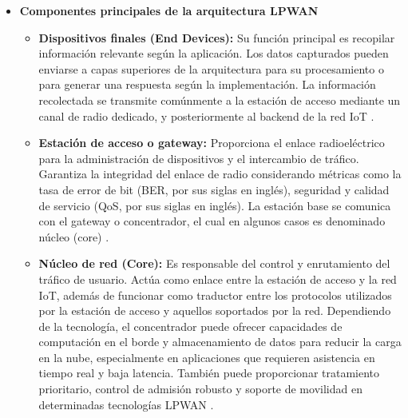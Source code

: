 \begin{itemize}

      \item \textbf{Componentes principales de la arquitectura LPWAN}

            \begin{itemize}

                  \item \textbf{Dispositivos finales (End Devices):} Su función
                        principal es recopilar información  relevante  según  la
                        aplicación. Los datos capturados pueden enviarse a capas
                        superiores de la arquitectura para  su  procesamiento  o
                        para generar una respuesta según la  implementación.  La
                        información recolectada se  transmite  comúnmente  a  la
                        estación de acceso mediante un canal de radio  dedicado,
                        y   posteriormente   al   backend   de   la   red    IoT
                        \parencite[]{chilamkurthy2022low}.

                  \item \textbf{Estación de acceso o gateway:}
                        Proporciona   el   enlace   radioeléctrico    para    la
                        administración  de  dispositivos  y  el  intercambio  de
                        tráfico. Garantiza la integridad  del  enlace  de  radio
                        considerando métricas como la tasa de error de bit (BER,
                        por sus  siglas  en  inglés),  seguridad  y  calidad  de
                        servicio (QoS, por sus siglas en  inglés).  La  estación
                        base se comunica con el gateway o concentrador, el  cual
                        en   algunos   casos   es   denominado   núcleo   (core)
                        \parencite[]{chilamkurthy2022low}.

                  \item \textbf{Núcleo de red (Core):} Es responsable del
                        control y enrutamiento del  tráfico  de  usuario.  Actúa
                        como enlace entre la estación de acceso y  la  red  IoT,
                        además de funcionar como traductor entre los  protocolos
                        utilizados  por  la  estación  de  acceso   y   aquellos
                        soportados por la red. Dependiendo de la tecnología,  el
                        concentrador puede ofrecer capacidades de computación en
                        el borde y almacenamiento de datos para reducir la carga
                        en la nube, especialmente en aplicaciones que  requieren
                        asistencia en tiempo real y baja latencia. También puede
                        proporcionar   tratamiento   prioritario,   control   de
                        admisión robusto y soporte de movilidad en  determinadas
                        tecnologías LPWAN \parencite[]{chilamkurthy2022low}.


\end{itemize}
\end{itemize}
